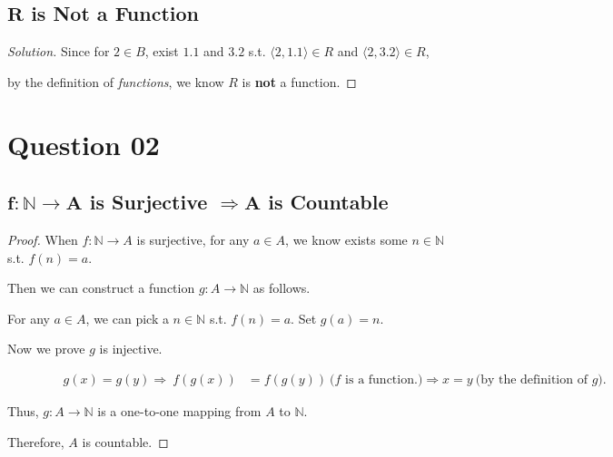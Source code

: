 \documentclass{article}
\newenvironment{solution}{\begin{proof}[\noindent\it Solution]}{\end{proof}}
\begin{document}
\vspace{1em}
\subsection{$\boldsymbol{R}$ is Not a Function}
\vspace{1em}
\begin{solution}
    Since for $2\in B$, exist $1.1$ and $3.2$ s.t. $\langle2,1.1\rangle\in R$ and $\langle2,3.2\rangle\in R$, 
    
    \hspace{6em}
    by the definition of \textit{functions}, we know $R$ is \textbf{not} a function.
\end{solution}

\vspace{3em}
\section{Question 02}
\vspace{1em}
\subsection{$\boldsymbol{f:\mathbb{N}\rightarrow A}$ is Surjective $\boldsymbol{\Rightarrow A}$ is Countable}
\vspace{1em}
\begin{proof}
    When $f:\mathbb{N}\to A$ is surjective, for any $a\in A$, we know exists some $n\in\mathbb{N}$ s.t. $f(n)=a$.
    
    \hspace{1.3em}
    Then we can construct a function $g:A\to\mathbb{N}$ as follows.
    
    \hspace{3.9em}
    For any $a\in A$, we can pick a $n\in\mathbb{N}$ s.t. $f(n)=a$. Set $g(a)=n$.
    
    \hspace{1.3em}
    Now we prove $g$ is injective. 
    
    \vspace{-3.3em}
    \begin{align*}
        \qquad\qquad g(x)=g(y) \Rightarrow \ f(g(x))&=f(g(y)) \ \text{($f$ is a function.)} \Rightarrow x=y\ \text{(by the definition of $g$)}.
    \end{align*}
    
    \vspace{-1.5em} \hspace{1.3em}
    Thus, $g:A\to \mathbb{N}$ is a one-to-one mapping from $A$ to $\mathbb{N}$.
    
    \hspace{1.3em}
    Therefore, $A$ is countable.
\end{proof}
\end{document}
